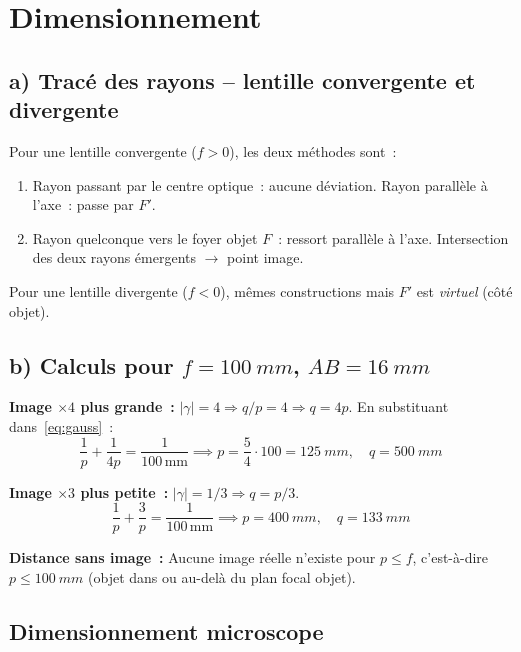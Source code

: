 ﻿\documentclass[a4paper, 11pt]{article}
\begin{document}
\section{Dimensionnement}

\subsection*{a) Tracé des rayons – lentille convergente et divergente}

Pour une lentille convergente ($f>0$), les deux méthodes sont~:
\begin{enumerate}[label=\textbf{M\arabic*.}]
  \item Rayon passant par le centre optique~: aucune déviation. Rayon parallèle à l'axe~: passe par $F'$.
  \item Rayon quelconque vers le foyer objet $F$~: ressort parallèle à l'axe. Intersection des deux rayons émergents $\to$ point image.
\end{enumerate}
Pour une lentille divergente ($f<0$), mêmes constructions mais $F'$ est \emph{virtuel} (côté objet).

\subsection*{b) Calculs pour $f = \SI{100}{mm}$, $AB = \SI{16}{mm}$}

\textbf{Image $\times 4$ plus grande~:} $|\gamma| = 4 \Rightarrow q/p = 4 \Rightarrow q = 4p$. En substituant dans~\eqref{eq:gauss}~:
\begin{equation*}
  \frac{1}{p} + \frac{1}{4p} = \frac{1}{100\,\mathrm{mm}} \implies p = \frac{5}{4}\cdot 100 = \SI{125}{mm}, \quad q = \SI{500}{mm}
\end{equation*}

\textbf{Image $\times 3$ plus petite~:} $|\gamma| = 1/3 \Rightarrow q = p/3$.
\begin{equation*}
  \frac{1}{p} + \frac{3}{p} = \frac{1}{100\,\mathrm{mm}} \implies p = \SI{400}{mm}, \quad q = \SI{133}{mm}
\end{equation*}

\textbf{Distance sans image~:} Aucune image réelle n'existe pour $p \leq f$, c'est-à-dire $p \leq \SI{100}{mm}$ (objet dans ou au-delà du plan focal objet).

\subsection*{Dimensionnement microscope}
\end{document}

